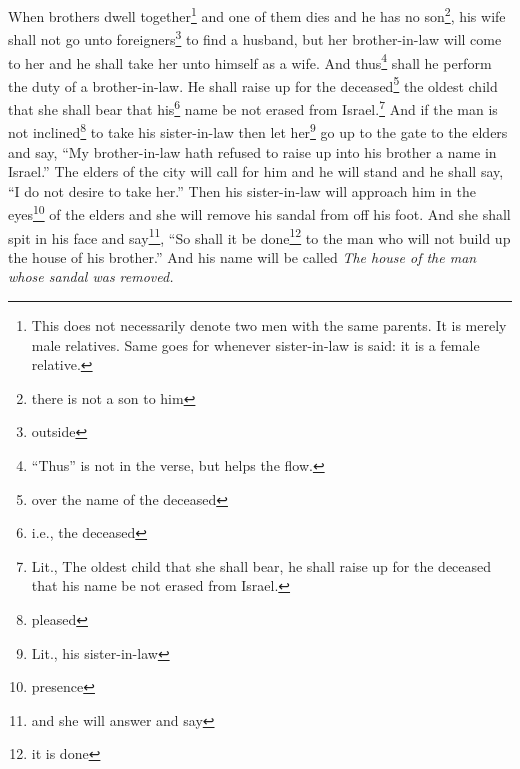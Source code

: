


\begin{enumerate*}[mode=unboxed]
     When brothers dwell together\footnote{This does not necessarily denote two men with the same parents. It is merely male relatives. Same goes for whenever sister-in-law is said: it is a female relative.} and one of them dies and he has no son\footnote{there is not a son to him}, his wife shall not go unto foreigners\footnote{outside} to find a husband, but her brother-in-law will come to her and he shall take her unto himself as a wife. And thus\footnote{``Thus'' is not in the verse, but helps the flow.} shall he perform the duty of a brother-in-law.%
     He shall raise up for the deceased\footnote{over the name of the deceased} the oldest child that she shall bear that his\footnote{i.e., the deceased} name be not erased from Israel.\footnote{Lit., The oldest child that she shall bear, he shall raise up for the deceased that his name be not erased from Israel.}%
     And if the man is not inclined\footnote{pleased} to take his sister-in-law then let her\footnote{Lit., his sister-in-law} go up to the gate to the elders and say, ``My brother-in-law hath refused to raise up into his brother a name in Israel.''%
     The elders of the city will call for him and he will stand and he shall say, ``I do not desire to take her.''%
     Then his sister-in-law will approach him in the eyes\footnote{presence} of the elders and she will remove his sandal from off his foot. And she shall spit in his face and say\footnote{and she will answer and say}, ``So shall it be done\footnote{it is done} to the man who will not build up the house of his brother.''%
     And his name will be called \textit{The house of the man whose sandal was removed.}%
\end{enumerate*}
